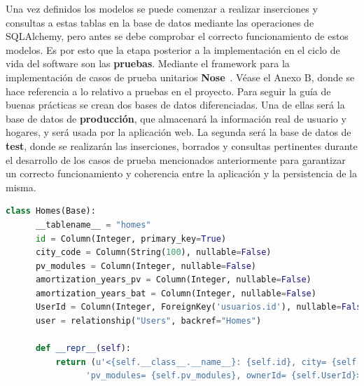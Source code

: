 Una vez definidos los modelos se puede comenzar a realizar inserciones y consultas a estas tablas en la base de datos mediante las operaciones de SQLAlchemy, pero antes se debe comprobar el correcto funcionamiento de estos modelos. Es por esto que la etapa posterior a la implementación en el ciclo de vida del software son las \textbf{pruebas}. Mediante el framework para la implementación de casos de prueba unitarios \textbf{Nose}~\cite{Nose}. Véase el Anexo B, donde se hace referencia a lo relativo a pruebas en el proyecto. Para seguir la guía de buenas prácticas se crean dos bases de datos diferenciadas. Una de ellas será la base de datos de \textbf{producción}, que almacenará la información real de usuario y hogares, y será usada por la aplicación web. La segunda será la base de datos de \textbf{test}, donde se realizarán las inserciones, borrados y consultas pertinentes durante el desarrollo de los casos de prueba mencionados anteriormente para garantizar un correcto funcionamiento y coherencia entre la aplicación y la persistencia de la misma.
\begin{lstlisting}[language=Python,float=ht,caption={Modelo \textit{Home}},label={lst:modelHome}]
class Homes(Base):
      __tablename__ = "homes"
      id = Column(Integer, primary_key=True)
      city_code = Column(String(100), nullable=False)
      pv_modules = Column(Integer, nullable=False)
      amortization_years_pv = Column(Integer, nullable=False)
      amortization_years_bat = Column(Integer, nullable=False)
      UserId = Column(Integer, ForeignKey('usuarios.id'), nullable=False)
      user = relationship("Users", backref="Homes")

      def __repr__(self):
          return (u'<{self.__class__.__name__}: {self.id}, city= {self.city_code}, ' \
                'pv_modules= {self.pv_modules}, ownerId= {self.UserId}>'.format(self=self))
\end{lstlisting}
\\

